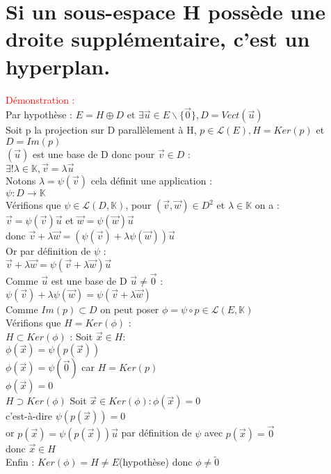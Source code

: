 \documentclass{article}
\begin{document}
\section{Si un sous-espace H possède une droite supplémentaire, c'est un hyperplan.}
\textcolor{red}{Démonstration :} \\ 
Par hypothèse : $E= H \oplus D$ et $\exists \vec{u} \in E \backslash \lbrace \vec 0 \rbrace, D=Vect(\vec u)$ \\ 
Soit p la projection sur D parallèlement à H, $p \in \mathcal{L}(E), H= Ker(p)$ et $D= Im(p)$ \\ 
$( \vec u)$ est une base de D donc pour $\vec v \in D$ : \\ 
$\exists ! \lambda \in  \mathbb{K}, \vec v = \lambda \vec u$ \\
Notons $ \lambda = \psi(\vec  v)$ cela définit une application : \\ 
$\psi : D \rightarrow \mathbb{K}$ \\ 
Vérifions que $\psi \in \mathcal{L}(D,\mathbb{K})$, pour $(\vec v, \vec w) \in D^2$ et $\lambda \in \mathbb{K}$ on a : \\ 
$\vec v = \psi( \vec v) \vec u$ et $\vec w = \psi( \vec w) \vec u$ \\ 
donc $\vec v + \lambda \vec w= (\psi(\vec v) + \lambda \psi(\vec w)) \vec u $ \\ 
Or par définition de $\psi$ : \\ 
$\vec v + \lambda \vec w = \psi (\vec v + \lambda \vec w) \vec u$ \\ 
Comme $\vec u$ est une base de D $\vec u \neq \vec 0$ : \\ 
$ \psi (\vec v) + \lambda \psi(\vec w) = \psi (\vec v + \lambda \vec w)$ \\ 
Comme $Im(p) \subset D$ on peut poser $ \phi = \psi \circ p \in \mathcal{L}(E,\mathbb{K})$ \\ 
Vérifions que $H= Ker(\phi)$ : \\ 
$H \subset Ker(\phi)$ : Soit $\vec x \in H :$ \\ 
$\phi (\vec x)= \psi (p(\vec x))$ \\ 
$\phi(\vec x)= \psi (\vec 0)$ car $H=Ker(p)$ \\ 
$\phi (\vec x)= 0$ \\ 
$H \supset Ker(\phi)$ Soit $\vec x \in Ker(\phi) : \phi (\vec x) =0$ \\ 
c'est-à-dire $\psi(p(\vec x))= 0$ \\ 
or $p(\vec x)= \psi(p(\vec x))\vec u$ par définition de $\psi$ avec $p(\vec x)= \vec 0$ \\ 
donc $\vec x \in H$ \\ 
Enfin : $Ker(\phi)=H \neq E$(hypothèse) donc $\phi \neq \tilde 0$
\end{document}
